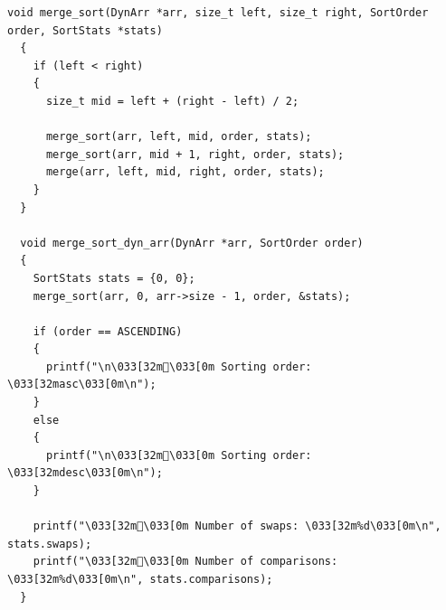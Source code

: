 \begin{lstlisting}[style=customc]
  void merge_sort(DynArr *arr, size_t left, size_t right, SortOrder order, SortStats *stats)
  {
    if (left < right)
    {
      size_t mid = left + (right - left) / 2;
  
      merge_sort(arr, left, mid, order, stats);
      merge_sort(arr, mid + 1, right, order, stats);
      merge(arr, left, mid, right, order, stats);
    }
  }
  
  void merge_sort_dyn_arr(DynArr *arr, SortOrder order)
  {
    SortStats stats = {0, 0};
    merge_sort(arr, 0, arr->size - 1, order, &stats);
  
    if (order == ASCENDING)
    {
      printf("\n\033[32m\033[0m Sorting order: \033[32masc\033[0m\n");
    }
    else
    {
      printf("\n\033[32m\033[0m Sorting order: \033[32mdesc\033[0m\n");
    }
  
    printf("\033[32m󰓡\033[0m Number of swaps: \033[32m%d\033[0m\n", stats.swaps);
    printf("\033[32m\033[0m Number of comparisons: \033[32m%d\033[0m\n", stats.comparisons);
  }
\end{lstlisting}

